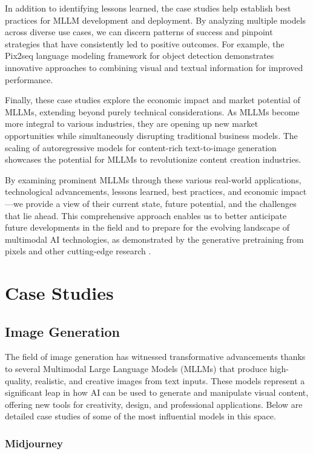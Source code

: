 In addition to identifying lessons learned, the case studies help establish best practices for MLLM development and deployment. By analyzing multiple models across diverse use cases, we can discern patterns of success and pinpoint strategies that have consistently led to positive outcomes. For example, the Pix2seq language modeling framework for object detection \cite{chen2023pix2seq} demonstrates innovative approaches to combining visual and textual information for improved performance.

Finally, these case studies explore the economic impact and market potential of MLLMs, extending beyond purely technical considerations. As MLLMs become more integral to various industries, they are opening up new market opportunities while simultaneously disrupting traditional business models. The scaling of autoregressive models for content-rich text-to-image generation \cite{yu2022scaling} showcases the potential for MLLMs to revolutionize content creation industries.

By examining prominent MLLMs through these various real-world applications, technological advancements, lessons learned, best practices, and economic impact—we provide a view of their current state, future potential, and the challenges that lie ahead. This comprehensive approach enables us to better anticipate future developments in the field and to prepare for the evolving landscape of multimodal AI technologies, as demonstrated by the generative pretraining from pixels and other cutting-edge research \cite{chen2023generative}.


\section{Case Studies}

\subsection{Image Generation}

The field of image generation has witnessed transformative advancements thanks to several Multimodal Large Language Models (MLLMs) that produce high-quality, realistic, and creative images from text inputs. These models represent a significant leap in how AI can be used to generate and manipulate visual content, offering new tools for creativity, design, and professional applications. Below are detailed case studies of some of the most influential models in this space.

\subsubsection{Midjourney}


